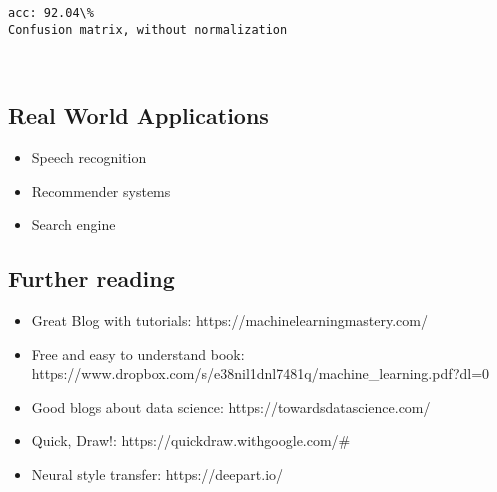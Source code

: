 \documentclass[11pt]{article}
\providecommand{\tightlist}{%
      \setlength{\itemsep}{0pt}\setlength{\parskip}{0pt}}
\begin{document}
    \begin{Verbatim}[commandchars=\\\{\}]
acc: 92.04\%
Confusion matrix, without normalization

    \end{Verbatim}

    \begin{center}
    \end{center}
    { \hspace*{\fill} \\}
    
    \hypertarget{real-world-applications}{%
\subsection{Real World Applications}\label{real-world-applications}}

    \begin{itemize}
\tightlist
\item
  Speech recognition
\end{itemize}

    \begin{itemize}
\tightlist
\item
  Recommender systems
\end{itemize}

    \begin{itemize}
\tightlist
\item
  Search engine
\end{itemize}

    \hypertarget{further-reading}{%
\subsection{Further reading}\label{further-reading}}

    \begin{itemize}
\tightlist
\item
  Great Blog with tutorials: https://machinelearningmastery.com/
\item
  Free and easy to understand book:
  https://www.dropbox.com/s/e38nil1dnl7481q/machine\_learning.pdf?dl=0
\item
  Good blogs about data science: https://towardsdatascience.com/
\item
  Quick, Draw!: https://quickdraw.withgoogle.com/\#
\item
  Neural style transfer: https://deepart.io/
\end{itemize}


    
    
    
    
\end{document}
